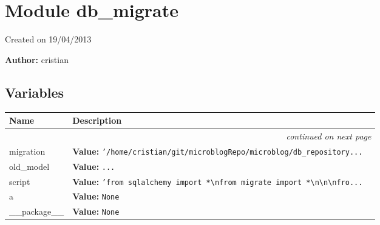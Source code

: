 %
%
%


\section{Module db\_migrate}

    \label{db_migrate}
Created on 19/04/2013

\textbf{Author:} cristian





  \subsection{Variables}

    \vspace{-1cm}
\hspace{\varindent}\begin{longtable}{|p{\varnamewidth}|p{\vardescrwidth}|l}
\cline{1-2}
\cline{1-2} \centering \textbf{Name} & \centering \textbf{Description}& \\
\cline{1-2}
\endhead\cline{1-2}\multicolumn{3}{r}{\small\textit{continued on next page}}\\\endfoot\cline{1-2}
\endlastfoot\raggedright m\-i\-g\-r\-a\-t\-i\-o\-n\- & \raggedright \textbf{Value:} 
{\tt \texttt{'}\texttt{/home/cristian/git/microblogRepo/microblog/db\_repository}\texttt{...}}&\\
\cline{1-2}
\raggedright o\-l\-d\-\_\-m\-o\-d\-e\-l\- & \raggedright \textbf{Value:} 
{\tt \texttt{...}}&\\
\cline{1-2}
\raggedright s\-c\-r\-i\-p\-t\- & \raggedright \textbf{Value:} 
{\tt \texttt{'}\texttt{from sqlalchemy import *{\textbackslash}nfrom migrate import *{\textbackslash}n{\textbackslash}n{\textbackslash}nfro}\texttt{...}}&\\
\cline{1-2}
\raggedright a\- & \raggedright \textbf{Value:} 
{\tt None}&\\
\cline{1-2}
\raggedright \_\-\_\-p\-a\-c\-k\-a\-g\-e\-\_\-\_\- & \raggedright \textbf{Value:} 
{\tt None}&\\
\cline{1-2}
\end{longtable}

